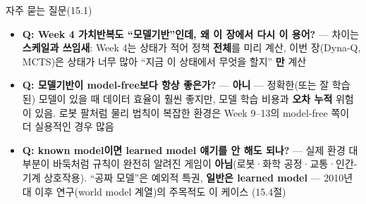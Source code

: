 \begin{frame}{자주 묻는 질문(15.1)}
  \small
  \begin{itemize}
    \item \textbf{Q: Week 4 가치반복도 ``모델기반''인데, 왜 이 장에서
      다시 이 용어?} --- 차이는 \textbf{스케일과 쓰임새}: Week 4는
      상태가 적어 정책 \textbf{전체}를 미리 계산, 이번 장(Dyna-Q,
      MCTS)은 상태가 너무 많아 ``지금 이 상태에서 무엇을 할지''
      \textbf{만} 계산
    \item \textbf{Q: 모델기반이 model-free보다 항상 좋은가?} ---
      \textbf{아니} --- 정확한(또는 잘 학습된) 모델이 있을 때 데이터
      효율이 훨씬 좋지만, 모델 학습 비용과 \textbf{오차 누적} 위험이
      있음. 로봇 팔처럼 물리 법칙이 복잡한 환경은 Week 9--13의
      model-free 쪽이 더 실용적인 경우 많음
    \item \textbf{Q: known model이면 learned model 얘기를 안 해도
      되나?} --- 실제 환경 대부분이 바둑처럼 규칙이 완전히 알려진
      게임이 \textbf{아님}(로봇·화학 공정·교통·인간-기계 상호작용).
      ``공짜 모델''은 예외적 특권, \textbf{일반은 learned model} ---
      2010년대 이후 연구(world model 계열)의 주목적도 이 케이스
      (15.4절)
  \end{itemize}
\end{frame}
